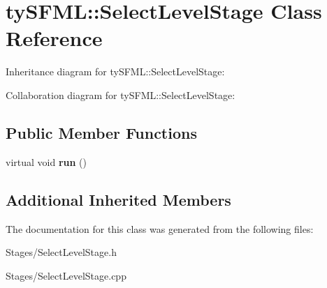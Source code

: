\hypertarget{classty_s_f_m_l_1_1_select_level_stage}{}\section{ty\+S\+F\+M\+L\+:\+:Select\+Level\+Stage Class Reference}
\label{classty_s_f_m_l_1_1_select_level_stage}


Inheritance diagram for ty\+S\+F\+M\+L\+:\+:Select\+Level\+Stage\+:


Collaboration diagram for ty\+S\+F\+M\+L\+:\+:Select\+Level\+Stage\+:
\subsection*{Public Member Functions}
\begin{DoxyCompactItemize}
\item 
\hypertarget{classty_s_f_m_l_1_1_select_level_stage_ac759725cac1827a405564d0c2db31858}{}virtual void {\bfseries run} ()\label{classty_s_f_m_l_1_1_select_level_stage_ac759725cac1827a405564d0c2db31858}

\end{DoxyCompactItemize}
\subsection*{Additional Inherited Members}


The documentation for this class was generated from the following files\+:\begin{DoxyCompactItemize}
\item 
Stages/Select\+Level\+Stage.\+h\item 
Stages/Select\+Level\+Stage.\+cpp\end{DoxyCompactItemize}
